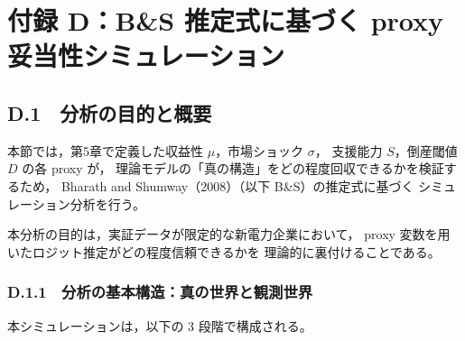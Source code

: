 
\chapter*{付録 D：B\&S 推定式に基づく proxy 妥当性シミュレーション}
\label{app:bs_simulation}

\section*{D.1　分析の目的と概要}

本節では，第5章で定義した収益性 $\mu$，市場ショック $\sigma$，
支援能力 $S$，倒産閾値 $D$ の各 proxy が，
理論モデルの「真の構造」をどの程度回収できるかを検証するため，
Bharath and Shumway（2008）（以下 B\&S）の推定式に基づく
シミュレーション分析を行う。

本分析の目的は，実証データが限定的な新電力企業において，
proxy 変数を用いたロジット推定がどの程度信頼できるかを
理論的に裏付けることである。

\subsection*{D.1.1　分析の基本構造：真の世界と観測世界}

本シミュレーションは，以下の 3 段階で構成される。


